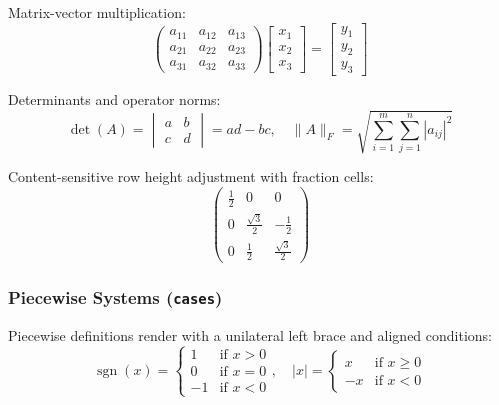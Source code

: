 \documentclass[11pt, a4paper]{article}
\begin{document}
Matrix-vector multiplication:
\[
\begin{pmatrix}
a_{11} & a_{12} & a_{13} \\
a_{21} & a_{22} & a_{23} \\
a_{31} & a_{32} & a_{33}
\end{pmatrix}
\begin{bmatrix}
x_1 \\
x_2 \\
x_3
\end{bmatrix}
=
\begin{bmatrix}
y_1 \\
y_2 \\
y_3
\end{bmatrix}
\]

Determinants and operator norms:
\[
\det(A) = \begin{vmatrix}
a & b \\
c & d
\end{vmatrix}
= ad - bc, \quad
\|A\|_F = \sqrt{\sum_{i=1}^m \sum_{j=1}^n |a_{ij}|^2}
\]

Content-sensitive row height adjustment with fraction cells:
\[
\begin{pmatrix}
\frac{1}{2} & 0 & 0 \\
0 & \frac{\sqrt{3}}{2} & -\frac{1}{2} \\
0 & \frac{1}{2} & \frac{\sqrt{3}}{2}
\end{pmatrix}
\]

\subsubsection{Piecewise Systems (\texttt{cases})}
Piecewise definitions render with a unilateral left brace and aligned conditions:
\[
\operatorname{sgn}(x) = \begin{cases}
1 & \text{if } x > 0 \\
0 & \text{if } x = 0 \\
-1 & \text{if } x < 0
\end{cases}, \quad
|x| = \begin{cases}
x & \text{if } x \ge 0 \\
-x & \text{if } x < 0
\end{cases}
\]
\end{document}
